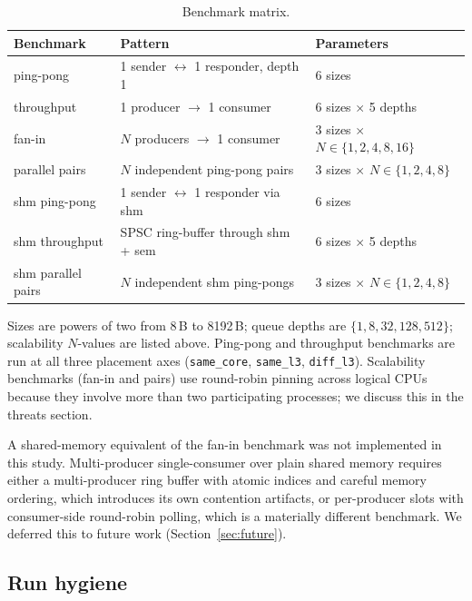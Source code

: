 \documentclass[a4paper,11pt]{article}
\begin{document}
\begin{table}[H]
\centering
\caption{Benchmark matrix.}
\label{tab:matrix}
\begin{tabular}{lll}
\toprule
\textbf{Benchmark}     & \textbf{Pattern}              & \textbf{Parameters} \\
\midrule
ping-pong              & 1 sender $\leftrightarrow$ 1 responder, depth 1 & 6 sizes \\
throughput             & 1 producer $\rightarrow$ 1 consumer            & 6 sizes $\times$ 5 depths \\
fan-in                 & $N$ producers $\rightarrow$ 1 consumer         & 3 sizes $\times$ $N\in\{1,2,4,8,16\}$ \\
parallel pairs         & $N$ independent ping-pong pairs                 & 3 sizes $\times$ $N\in\{1,2,4,8\}$ \\
shm ping-pong          & 1 sender $\leftrightarrow$ 1 responder via shm  & 6 sizes \\
shm throughput         & SPSC ring-buffer through shm + sem              & 6 sizes $\times$ 5 depths \\
shm parallel pairs     & $N$ independent shm ping-pongs                  & 3 sizes $\times$ $N\in\{1,2,4,8\}$ \\
\bottomrule
\end{tabular}
\end{table}

Sizes are powers of two from 8\,B to 8192\,B; queue depths are
$\{1,8,32,128,512\}$; scalability $N$-values are listed above. Ping-pong
and throughput benchmarks are run at all three placement axes
(\texttt{same\_core}, \texttt{same\_l3}, \texttt{diff\_l3}). Scalability
benchmarks (fan-in and pairs) use round-robin pinning across logical CPUs
because they involve more than two participating processes; we discuss
this in the threats section.

A shared-memory equivalent of the fan-in benchmark was not implemented in
this study. Multi-producer single-consumer over plain shared memory
requires either a multi-producer ring buffer with atomic indices and
careful memory ordering, which introduces its own contention artifacts,
or per-producer slots with consumer-side round-robin polling, which is a
materially different benchmark. We deferred this to future work
(Section~\ref{sec:future}).

\subsection{Run hygiene}
\label{sec:method:hygiene}
\end{document}
